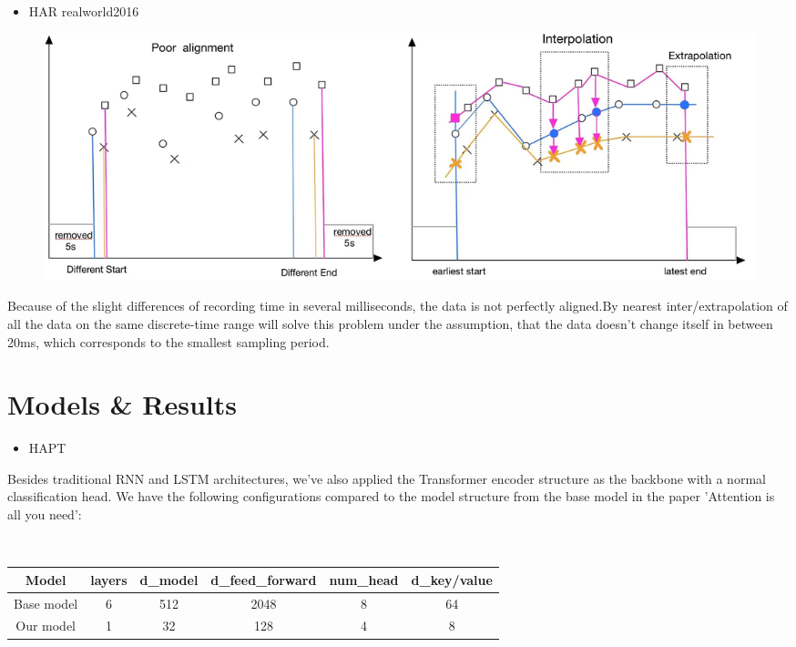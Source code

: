 \documentclass[landscape,a3,final,24pt]{issposter}
\begin{document}
\begin{multicols}{3}
\begin{itemize}
\item HAR realworld2016\end{itemize}

\begin{figure}
\centering
\includegraphics[scale=0.175]{Pictures/Interpolation_example.jpg}
\label{sample running}
\end{figure}

Because of the slight differences of recording time in several milliseconds, the data is not perfectly aligned.By nearest inter/extrapolation of all the data on the same discrete-time range will solve this problem under the assumption, that the data doesn't change itself in between 20ms, which corresponds to the smallest sampling period.

\vfill\null
\columnbreak


\section{Models \& Results}
\begin{itemize}\item HAPT\end{itemize}

Besides traditional RNN and LSTM architectures, we've also applied the Transformer encoder structure as the backbone with a normal classification head. We have the following configurations compared to the model structure from the base model in the paper 'Attention is all you need':

\hspace*{\fill} \\

\begin{tabular}{cccccc}
\toprule
Model	&layers&d\_model&d\_feed\_forward&num\_head&d\_key/value\\
\midrule
Base model&	6&	512&	2048&	8&	64\\
Our model	&1&	32&	128&	4&	8\\
\bottomrule
\end{tabular}


\end{multicols}
\end{document}
